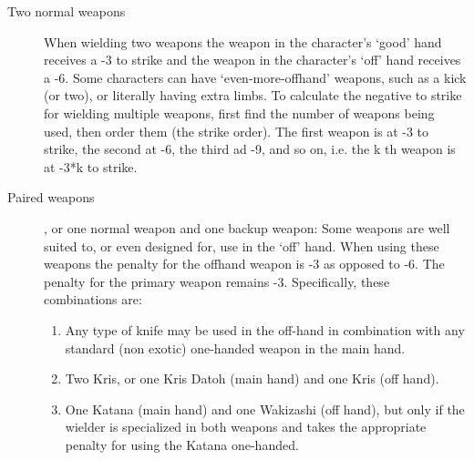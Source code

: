 \documentclass[twoside]{book}
\begin{document}
\begin{description}
    
  \item[ Two normal weapons ] 
    {  
      When wielding two weapons the weapon in the
                  character's `good' hand receives a -3
                  to strike and the weapon in the character's
                  `off' hand receives a -6. Some characters
                  can have `even-more-offhand' weapons, such
                  as a kick (or two), or literally having extra limbs. To
                  calculate the negative to strike for wielding multiple
                  weapons, first find the number of weapons being used,
                  then order them (the strike order). The first weapon is
                  at -3 to strike, the second at -6, the third ad -9, and
                  so on, i.e. the k
                   th   weapon is at -3*k to strike. 
                
    }
  
  \item[ Paired weapons ] 
    {  
     , or one normal weapon and one backup weapon:
                  Some weapons are well suited to, or even designed for,
                  use in the `off' hand. When using these
                  weapons the penalty for the offhand weapon is -3 as
                  opposed to -6. The penalty for the primary weapon
                  remains -3. Specifically, these combinations are:
                  
\begin{enumerate}
      
  \item 
                        
    {  
     Any type of knife may be used in the
                         off-hand in combination with any standard (non
                         exotic) one-handed weapon in the main hand.
                         
    }
  
                    
  \item 
                      
    {  
     Two Kris, or one Kris Datoh (main hand) and
                       one Kris (off hand). 
    }
  
                    
  \item 
                      
    {  
     One Katana (main hand) and one Wakizashi
                       (off hand), but only if the wielder is specialized
                       in both weapons and takes the appropriate penalty
                       for using the Katana one-handed. 
    }
  

\end{enumerate}}
\end{description}
\end{document}
